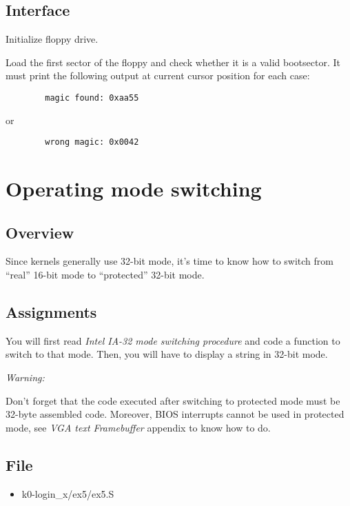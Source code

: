 \subsection*{Interface}
{
  Initialize floppy drive.
}

{
  Load the first sector of the floppy and check whether it is a valid
  bootsector. It must print the following output at current cursor
  position for each case:
}
\begin{verbatim}
        magic found: 0xaa55
\end{verbatim}
\function{}{} {
or
}
\begin{verbatim}
        wrong magic: 0x0042
\end{verbatim}


%
%

\newpage

\section{Operating mode switching}

\subsection*{Overview}
Since kernels generally use 32-bit mode, it's time to know how to switch from
``real'' 16-bit mode to ``protected'' 32-bit mode.

\subsection*{Assignments}
You will first read \emph{Intel IA-32 mode switching procedure} and code a
function to switch to that mode. Then, you will have to display a string in
32-bit mode.

{\em Warning:}

Don't forget that the code executed after switching to protected mode must be
32-byte assembled code. Moreover, BIOS interrupts cannot be used in protected
mode, see \emph{VGA text Framebuffer} appendix to know how to do.

\subsection*{File}
\begin{itemize}
  \item k0-login\_x/ex5/ex5.S
\end{itemize}

